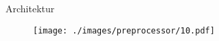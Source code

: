 \begin{frame}{Architektur}
    \begin{figure}
    	\centering
    	\texttt{[image: ./images/preprocessor/10.pdf]}
    \end{figure}
\end{frame}
